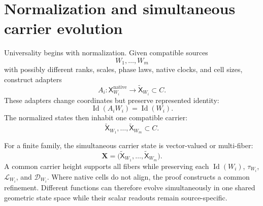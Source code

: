 \documentclass[11pt]{article}
\theoremstyle{definition}
\begin{document}
\section{Normalization and simultaneous carrier evolution}\label{sec:normalization-simultaneous}

Universality begins with normalization.  Given compatible sources
\[
W_1,\ldots,W_m
\]
with possibly different ranks, scales, phase laws, native clocks, and cell
sizes, construct adapters
\[
A_i:\mathsf X_{W_i}^{\mathrm{native}}\longrightarrow
\widetilde{\mathsf X}_{W_i}\subset C.
\]
These adapters change coordinates but preserve represented identity:
\[
\operatorname{Id}(A_iW_i)=\operatorname{Id}(W_i).
\]
The normalized states then inhabit one compatible carrier:
\[
\widetilde{\mathsf X}_{W_1},\ldots,\widetilde{\mathsf X}_{W_m}\subset C.
\]

For a finite family, the simultaneous carrier state is vector-valued or
multi-fiber:
\[
\mathbf X=
\bigl(
\widetilde{\mathsf X}_{W_1},\ldots,\widetilde{\mathsf X}_{W_m}
\bigr).
\]
A common carrier height supports all fibers while preserving each
\(\operatorname{Id}(W_i)\), \(\tau_{W_i}\), \(\mathcal L_{W_i}\), and
\(\mathcal D_{W_i}\).  Where native cells do not align, the proof constructs a
common refinement.  Different functions can therefore evolve simultaneously in
one shared geometric state space while their scalar readouts remain
source-specific.

\end{document}
